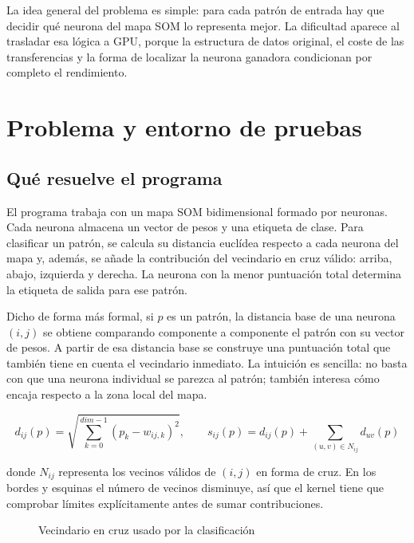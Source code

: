 \documentclass[11pt,a4paper]{article}
\begin{document}
La idea general del problema es simple: para cada patrón de entrada hay que decidir qué neurona del mapa SOM lo representa mejor. La dificultad aparece al trasladar esa lógica a GPU, porque la estructura de datos original, el coste de las transferencias y la forma de localizar la neurona ganadora condicionan por completo el rendimiento.

\section{Problema y entorno de pruebas}

\subsection{Qué resuelve el programa}

El programa trabaja con un mapa SOM bidimensional formado por neuronas. Cada neurona almacena un vector de pesos y una etiqueta de clase. Para clasificar un patrón, se calcula su distancia euclídea respecto a cada neurona del mapa y, además, se añade la contribución del vecindario en cruz válido: arriba, abajo, izquierda y derecha. La neurona con la menor puntuación total determina la etiqueta de salida para ese patrón.

Dicho de forma más formal, si $p$ es un patrón, la distancia base de una neurona $(i,j)$ se obtiene comparando componente a componente el patrón con su vector de pesos. A partir de esa distancia base se construye una puntuación total que también tiene en cuenta el vecindario inmediato. La intuición es sencilla: no basta con que una neurona individual se parezca al patrón; también interesa cómo encaja respecto a la zona local del mapa.

\begin{equation}
  d_{ij}(p)=\sqrt{\sum_{k=0}^{dim-1}(p_k-w_{ij,k})^2},
  \qquad
  s_{ij}(p)=d_{ij}(p)+\sum_{(u,v)\in N_{ij}} d_{uv}(p)
\end{equation}

donde $N_{ij}$ representa los vecinos válidos de $(i,j)$ en forma de cruz. En los bordes y esquinas el número de vecinos disminuye, así que el kernel tiene que comprobar límites explícitamente antes de sumar contribuciones.

\begin{figure}[H]
\centering
{}
\caption{Vecindario en cruz usado por la clasificación}
\label{fig:vecindario-cruz}
\end{figure}
\end{document}
